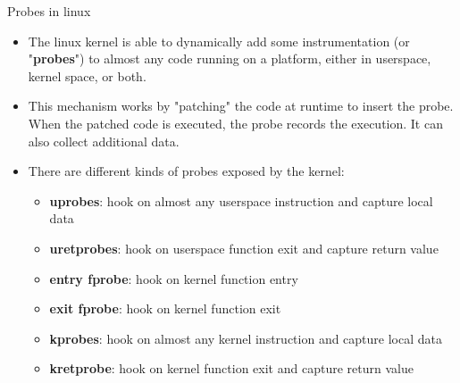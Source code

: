 \begin{frame}{Probes in linux}
	\begin{itemize}
    \item The linux kernel is able to dynamically add some instrumentation
      (or "\textbf{probes}") to almost any code running on a platform,
      either in userspace, kernel space, or both.
    \item This mechanism works by "patching" the code at runtime to insert
      the probe. When the patched code is executed, the probe records the
      execution. It can also collect additional data.
    \item There are different kinds of probes exposed by the kernel:
			\begin{itemize}
        \item \textbf{uprobes}: hook on almost any userspace instruction
          and capture local data
        \item \textbf{uretprobes}: hook on userspace function exit and
          capture return value
        \item \textbf{entry fprobe}: hook on kernel function entry
        \item \textbf{exit fprobe}: hook on kernel function exit
        \item \textbf{kprobes}: hook on almost any kernel instruction and
          capture local data
        \item \textbf{kretprobe}: hook on kernel function exit and capture
          return value
			\end{itemize}
	\end{itemize}
\end{frame}


